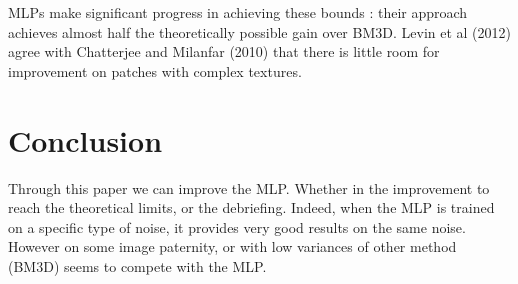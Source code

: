 \documentclass[10pt,a4paper]{article}
\begin{document}
MLPs make significant progress in achieving these bounds : their approach achieves almost half the theoretically possible gain over BM3D. Levin et al (2012) agree with Chatterjee and Milanfar (2010) that there is little room for improvement on patches with complex textures. 

\section{Conclusion}

Through this paper we can improve the MLP. Whether in the improvement to reach the theoretical limits, or the debriefing. Indeed, when the MLP is trained on a specific type of noise, it provides very good results on the same noise. However on some image paternity, or with low variances of other method (BM3D) seems to compete with the MLP.

\printbibliography
\end{document}
